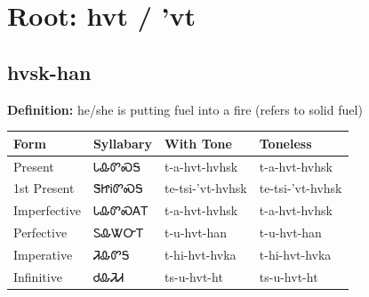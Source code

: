 \documentclass{article}%
\begin{document}
%
\normalsize%
\section*{Root: hvt / 'vt}%
\subsection*{hvsk-han}%
\textbf{Definition: }%
he/she is putting fuel into a fire (refers to solid fuel)%
\\[0.5em]%
\begin{tabular}{|l|l|l|l|}%
\hline%
\textbf{Form}&\textbf{Syllabary}&\textbf{With Tone}&\textbf{Toneless}\\%
\hline%
Present&ᏓᎲᏛᏍᎦ&t{-}a{-}hvt{-}hvhsk&t{-}a{-}hvt{-}hvhsk\\%
1st Present&ᏕᏥᎥᏛᏍᎦ&te{-}tsi{-}'vt{-}hvhsk&te{-}tsi{-}'vt{-}hvhsk\\%
Imperfective&ᏓᎲᏛᏍᎪᎢ&t{-}a{-}hvt{-}hvhsk&t{-}a{-}hvt{-}hvhsk\\%
Perfective&ᏚᎲᏔᏅᎢ&t{-}u{-}hvt{-}han&t{-}u{-}hvt{-}han\\%
Imperative&ᏘᎲᏛᎦ&t{-}hi{-}hvt{-}hvka&t{-}hi{-}hvt{-}hvka\\%
Infinitive&ᏧᎲᏘᏗ&ts{-}u{-}hvt{-}ht&ts{-}u{-}hvt{-}ht\\%
\hline%
\end{tabular}%
\\[1em]%
\end{document}
